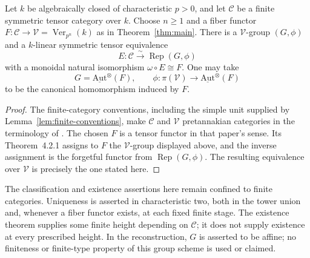 \begin{corollary}
\label{cor:generalized-tannaka}
Let $k$ be algebraically closed of characteristic $p>0$, and let
$\mathcal C$ be a finite symmetric tensor category over $k$. Choose
$n\ge1$ and a fiber functor
$F:\mathcal C\to\mathcal V=\operatorname{Ver}_{p^n}(k)$ as in
Theorem~\ref{thm:main}. There is a $\mathcal V$-group $(G,\phi)$ and a
$k$-linear symmetric tensor equivalence
\[
 E:\mathcal C\xrightarrow{\sim}\operatorname{Rep}(G,\phi)
\]
with a monoidal natural isomorphism $\omega\circ E\cong F$. One may take
\[
 G=\underline{\mathrm{Aut}}^{\otimes}(F),\qquad
 \phi:\pi(\mathcal V)\longrightarrow
       \underline{\mathrm{Aut}}^{\otimes}(F)
\]
to be the canonical homomorphism induced by $F$.
\end{corollary}

\begin{proof}
The finite-category conventions, including the simple unit supplied by
Lemma~\ref{lem:finite-conventions}, make $\mathcal C$ and $\mathcal V$
pretannakian categories in the terminology of
\cite{CoulembierEtingofOstrikIncompressible}. The chosen $F$ is a tensor
functor in that paper's sense. Its Theorem~4.2.1 assigns to $F$ the
$\mathcal V$-group displayed above, and the inverse assignment is the
forgetful functor from $\operatorname{Rep}(G,\phi)$. The resulting
equivalence over $\mathcal V$ is precisely the one stated here.
\end{proof}

The classification and existence assertions here remain confined to
finite categories. Uniqueness is asserted in characteristic two, both
in the tower union and, whenever a fiber functor exists, at each fixed
finite stage. The existence theorem supplies some finite height depending
on $\mathcal C$; it does not supply existence at every prescribed height.
In the reconstruction, $G$ is asserted to be affine; no
finiteness or finite-type property of this group scheme is used or claimed.

